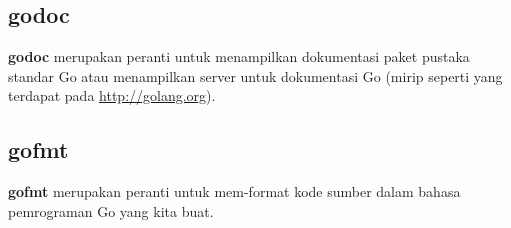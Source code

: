 

\subsection{godoc}

\textbf{godoc} merupakan peranti untuk menampilkan dokumentasi paket pustaka standar Go atau menampilkan server untuk dokumentasi Go (mirip seperti yang terdapat pada \url{http://golang.org}).



\subsection{gofmt}

\textbf{gofmt} merupakan peranti untuk mem-format kode sumber dalam bahasa pemrograman Go yang kita buat.


